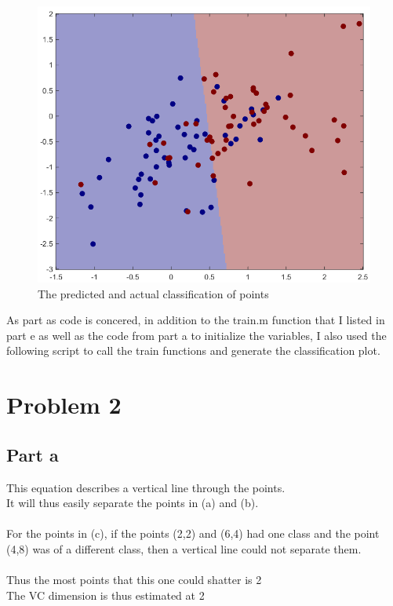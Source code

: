 \documentclass[twoside,11pt]{article}
\theoremstyle{definition}
\begin{document}
\begin{figure}[h]
\centering
\includegraphics[width=5 in]{prob1fPlotB2.png}
\caption{The predicted and actual classification of points}
\end{figure}

As part as code is concered, in addition to the train.m function that I listed in part e as well as the code from part a to initialize the variables, I also used the following script to call the train functions and generate the classification plot.


\newpage

\section*{Problem 2}

\subsection*{Part a}

This equation describes a vertical line through the points.\\
It will thus easily separate the points in (a) and (b).\\
\\
For the points in (c), if the points (2,2) and (6,4) had one class and the point (4,8) was of a different class, then a vertical line could not separate them.\\
\\
Thus the most points that this one could shatter is 2\\
The VC dimension is thus estimated at 2
\end{document}
